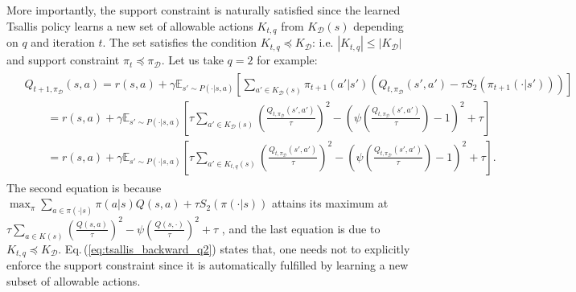 \documentclass{article}
\newcommand{\AdaBracket}[1]{\left(#1\right)}
\newcommand{\AdaRectBracket}[1]{\left[#1\right]}
\newcommand{\expectation}[2]{\mathbb{E}_{#1}\AdaRectBracket{#2}}
\newcommand{\eq}[1]{Eq.\,(#1)}
\newcommand{\datasetOptimalQ}{Q_{*, \pi_{\mathcal{D}}}}
\newcommand{\datasetPolicy}{\pi_{\mathcal{D}}}
\begin{document}
More importantly, the support constraint is naturally satisfied since 
the learned Tsallis policy learns a new set of allowable actions $K_{t, q}$ from $K_\mathcal{D}(s)$ depending on $q$ and iteration $t$.
The set satisfies the condition $K_{t, q} \preceq K_\mathcal{D}$:
 i.e. $|K_{t, q}| \leq |K_\mathcal{D}|$ and support constraint $\pi_t \preceq \datasetPolicy$.
 Let us take $q=2$ for example:
 \begin{align}
    \begin{split}
    &Q_{t+1, \datasetPolicy}(s,a) = r(s,a) +  \gamma \expectation{s'\sim P(\cdot | s,a)}{ \sum_{a' \in K_{\mathcal{D}}(s)} \!\!\!\!\! \pi_{t+1}(a'|s') \AdaBracket{Q_{t, \datasetPolicy}(s',a') - \tau S_2(\pi_{t+1}(\cdot|s'))}}\\
    &\qquad = r(s,a) + \gamma \expectation{s'\sim P(\cdot | s,a)}{ \tau\sum_{a' \in K_{\mathcal{D}}(s)} \!\! \AdaBracket{\frac{Q_{t, \datasetPolicy}(s',a')}{\tau}}^2 - \AdaBracket{ \psi\AdaBracket{\frac{Q_{t, \datasetPolicy}(s',a')}{\tau}} - 1 }^2 + \tau}\\
    &\qquad = r(s,a) + \gamma \expectation{s'\sim P(\cdot | s,a)}{ \tau\sum_{a' \in K_{t,q}(s)} \!\! \AdaBracket{\frac{Q_{t, \datasetPolicy}(s',a')}{\tau}}^2 - \AdaBracket{ \psi\AdaBracket{\frac{Q_{t, \datasetPolicy}(s',a')}{\tau}} - 1 }^2 + \tau}.
    \end{split}
    \label{eq:tsallis_backward_q2}
 \end{align}
 The second equation is because $\max_{\pi}\sum_{a\in\pi(\cdot|s)}\pi(a|s)Q(s,a) + \tau S_2(\pi(\cdot|s))$ attains its maximum at $\tau \sum_{a \in K(s)}\AdaBracket{ \frac{Q(s,a)}{\tau} }^2 - \psi\AdaBracket{\frac{Q(s, \cdot)}{\tau}}^2 + \tau$ \cite{Lee2018-TsallisRAL,Martins16-sparsemax}, and the last equation is due to $K_{t, q} \preceq K_\mathcal{D}$.
 \eq{\ref{eq:tsallis_backward_q2}} states that, one needs not to explicitly enforce the support constraint since it is automatically fulfilled by learning a new subset of allowable actions.
\end{document}
